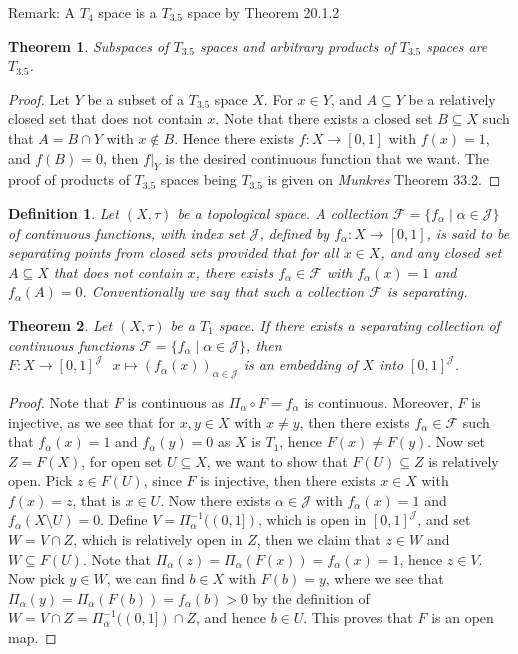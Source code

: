 \documentclass[11pt]{book}
\theoremstyle{break}
\theoremstyle{break}
\newtheorem{thm}{Theorem}[section]
\newtheorem{defn}{Definition}[corL]
\newcommand{\remark}{\color{blue}Remark: \color{black}}
\begin{document}
\remark A $T_{4}$ space is a $T_{3.5}$ space by Theorem 20.1.2 

\begin{thm}
Subspaces of $T_{3.5}$ spaces and arbitrary products of $T_{3.5}$ spaces are $T_{3.5}$. 
\end{thm}
\begin{proof}
Let $Y$ be a subset of a $T_{3.5}$ space $X$. For $x \in Y$, and $A \subseteq Y$ be a relatively closed set that does not contain $x$. Note that there exists a closed set $B \subseteq X$ such that $A = B \cap Y$ with $x \notin B$. Hence there exists $f:X \to [0,1]$ with $f(x) = 1$, and $f(B) =0$, then $f|_Y$ is the desired continuous function that we want. The proof of products of $T_{3.5}$ spaces being $T_{3.5}$ is given on \textit{Munkres} Theorem 33.2.   
\end{proof}

\begin{defn}
Let $(X,\tau)$ be a topological space. A collection $\mathcal{F} = \{f_\alpha \mid \alpha \in \mathcal{J}\}$ of continuous functions, with index set $\mathcal{J}$, defined by $f_\alpha :X \to [0,1]$, is said to be separating points from closed sets provided that for all $x \in X$, and any closed set $A\subseteq X$ that does not contain $x$, there exists $f_\alpha\in \mathcal{F}$ with $f_\alpha(x) = 1$ and $f_\alpha(A) = 0$. Conventionally we say that such a collection $\mathcal{F}$ is separating.
\end{defn}

\begin{thm}
Let $(X,\tau)$ be a $T_1$ space. If there exists a separating collection of continuous functions $\mathcal{F} = \{f_\alpha\mid \alpha \in \mathcal{J}\}$, then $F:X \to [0,1]^{\mathcal{J}} \ \ \ x\mapsto (f_\alpha(x))_{\alpha \in \mathcal{J}}$ is an embedding of $X$ into $[0,1]^\mathcal{J}$. 
\end{thm}
\begin{proof}
Note that $F$ is continuous as $\Pi_\alpha \circ F = f_\alpha$ is continuous. Moreover, $F$ is injective, as we see that for $x,y \in X$ with $x \neq y$, then there exists $f_\alpha\in \mathcal{F}$ such that $f_\alpha(x) = 1$ and $f_\alpha(y) = 0$ as $X$ is $T_1$, hence $F(x) \neq F(y)$. Now set $Z = F(X)$, for open set $U \subseteq X$, we want to show that $F(U) \subseteq Z$ is relatively open. Pick $z \in F(U)$, since $F$ is injective, then there exists $x \in X$ with $f(x) = z$, that is $x \in U$. Now there exists $\alpha \in \mathcal{J}$ with $f_\alpha(x) = 1$ and $f_\alpha(X\setminus U)  =0$. Define $V = \Pi_\alpha^{-1}((0,1])$, which is open in $[0,1]^{\mathcal{J}}$, and set $W = V\cap Z$, which is relatively open in $Z$, then we claim that $z \in W$ and $W \subseteq F(U)$. Note that $\Pi_\alpha(z) = \Pi_\alpha(F(x)) = f_\alpha(x)=1$, hence $z \in V$. Now pick $y \in W$, we can find $b \in X$ with $F(b) = y$, where we see that $\Pi_\alpha(y) = \Pi_\alpha(F(b)) = f_\alpha(b) > 0$ by the definition of $W = V\cap Z = \Pi_\alpha^{-1}((0,1]) \cap Z$, and hence $b \in U$. This proves that $F$ is an open map.  
\end{proof}
\end{document}
